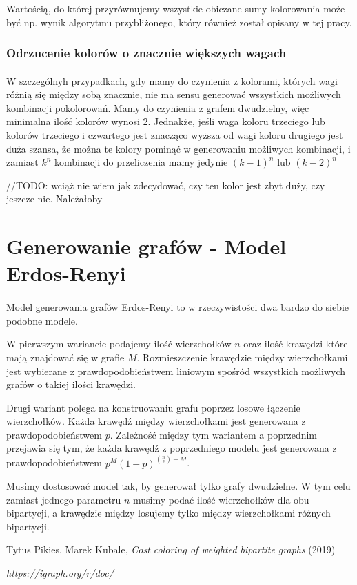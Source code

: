 \documentclass{article}
\begin{document}
Wartością, do której przyrównujemy wszystkie obiczane sumy kolorowania może być np. wynik algorytmu przybliżonego, który również został opisany w tej pracy.

\subsubsection*{Odrzucenie kolorów o znacznie większych wagach}

\paragraph{} W szczególnyh przypadkach, gdy mamy do czynienia z kolorami, których wagi różnią się między sobą znacznie, nie ma sensu generować wszystkich możliwych kombinacji pokolorowań. Mamy do czynienia z grafem dwudzielny, więc minimalna ilość kolorów wynosi 2. Jednakże, jeśli waga koloru trzeciego lub kolorów trzeciego i czwartego jest znacząco wyższa od wagi koloru drugiego jest duża szansa, że można te kolory pominąć w generowaniu możliwych kombinacji, i zamiast $k^n$ kombinacji do przeliczenia mamy jedynie $(k-1)^n$ lub $(k-2)^n$

//TODO: wciąż nie wiem jak zdecydować, czy ten kolor jest zbyt duży, czy jeszcze nie. Należałoby 

\section{Generowanie grafów - Model Erdos-Renyi}

\paragraph{} Model generowania grafów Erdos-Renyi to w rzeczywistości dwa bardzo do siebie podobne modele. 

W pierwszym wariancie podajemy ilość wierzchołków $n$ oraz ilość krawędzi które mają znajdować się w grafie $M$. Rozmieszczenie krawędzie między wierzchołkami jest wybierane z prawdopodobieństwem liniowym spośród wszystkich możliwych grafów o takiej ilości krawędzi.

Drugi wariant polega na konstruowaniu grafu poprzez losowe łączenie wierzchołków. Każda krawędź między wierzchołkami jest generowana z prawdopodobieństwem $p$. Zależność między tym wariantem a poprzednim przejawia się tym, że każda krawędź z poprzedniego modelu jest generowana z prawdopodobieństwem $p^M(1-p)^{{n \choose 2}-M}$.

Musimy dostosować model tak, by generował tylko grafy dwudzielne. W tym celu zamiast jednego parametru $n$ musimy podać ilość wierzchołków dla obu bipartycji, a krawędzie między losujemy tylko między wierzchołkami różnych bipartycji.

\begin{thebibliography}{9}

Tytus Pikies, Marek Kubale,
\emph{Cost coloring of weighted bipartite graphs}
(2019)

\emph{https://igraph.org/r/doc/}

\end{thebibliography}
\end{document}
